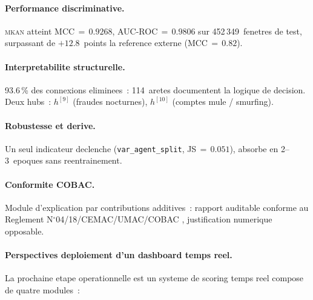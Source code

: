 \documentclass[11pt,a4paper,twocolumn]{article}
\newcommand{\MKAN}{\textsc{mkan}}
\begin{document}
\paragraph{Performance discriminative.}
\MKAN{} atteint MCC$\,{=}\,0.9268$, AUC-ROC$\,{=}\,0.9806$ sur
452\,349~fenetres de test, surpassant de $+12.8$~points la
reference externe \cite{azamuke2025} (MCC$\,{=}\,0.82$).

\paragraph{Interpretabilite structurelle.}
93.6\,\% des connexions eliminees~: 114~aretes documentent la
logique de decision. Deux hubs~: $h^{[9]}$ (fraudes nocturnes),
$h^{[10]}$ (comptes mule / smurfing).

\paragraph{Robustesse et derive.}
Un seul indicateur declenche (\texttt{var\_agent\_split},
JS$\,{=}\,0.051$), absorbe en 2--3~epoques sans reentrainement.

\paragraph{Conformite COBAC.}
Module d'explication par contributions additives~:
rapport auditable conforme au Reglement N$^{\circ}$04/18/CEMAC/UMAC/COBAC
\cite{cobac2018}, justification numerique opposable.

\paragraph{Perspectives \textemdash{} deploiement d'un dashboard temps reel.}
La prochaine etape operationnelle est un systeme de scoring temps
reel compose de quatre modules~:
\end{document}
